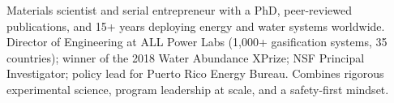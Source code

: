 
\begin{cvparagraph}
Materials scientist and serial entrepreneur with a PhD, peer-reviewed publications, and 15+ years deploying energy and water systems worldwide. Director of Engineering at ALL Power Labs (1,000+ gasification systems, 35 countries); winner of the 2018 Water Abundance XPrize; NSF Principal Investigator; policy lead for Puerto Rico Energy Bureau. Combines rigorous experimental science, program leadership at scale, and a safety-first mindset.
\end{cvparagraph}
